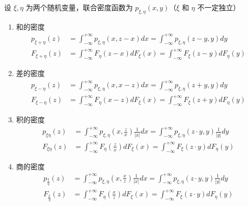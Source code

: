 \documentclass[12pt,a4paper]{amsart}
\begin{document}
\begin{proposition}
    设 $\xi, \eta$ 为两个随机变量，联合密度函数为 $p_{\xi, \eta}(x, y)$（$\xi$ 和 $\eta$ 不一定独立）
    \begin{enumerate}
        \item 和的密度
        \begin{equation}
            \begin{aligned}
                p_{\xi+\eta}(z) &= \int_{-\infty}^{+\infty}p_{\xi, \eta}(x, z-x)dx = \int_{-\infty}^{+\infty}p_{\xi, \eta}(z-y, y)dy \\
                F_{\xi+\eta}(z) &= \int_{-\infty}^{+\infty}F_{\eta}(z-x)dF_{\xi}(x) = \int_{-\infty}^{+\infty}F_{\xi}(z-y)dF_{\eta}(y)
            \end{aligned}
        \end{equation}
        \item 差的密度
        \begin{equation}
            \begin{aligned}
                p_{\xi-\eta}(z) &= \int_{-\infty}^{+\infty}p_{\xi, \eta}(x, x-z)dx = \int_{-\infty}^{+\infty}p_{\xi, \eta}(z+y, y)dy \\
                F_{\xi-\eta}(z) &= \int_{-\infty}^{+\infty}F_{\eta}(x-z)dF_{\xi}(x) = \int_{-\infty}^{+\infty}F_{\xi}(z+y)dF_{\eta}(y)
            \end{aligned}
        \end{equation}
        \item 积的密度
        \begin{equation}
            \begin{aligned}
                p_{\xi\eta}(z) &= \int_{-\infty}^{+\infty}p_{\xi, \eta}(x, \frac{z}{x})\frac{1}{|x|}dx = \int_{-\infty}^{+\infty}p_{\xi, \eta}(z\cdot y, y)\frac{1}{|y|}dy \\
                F_{\xi\eta}(z) &= \int_{-\infty}^{+\infty}F_{\eta}(\frac{z}{x})dF_{\xi}(x) = \int_{-\infty}^{+\infty}F_{\xi}(z\cdot y)dF_{\eta}(y)
            \end{aligned}
        \end{equation}
        \item 商的密度
        \begin{equation}
            \begin{aligned}
                p_{\frac{\xi}{\eta}}(z) &= \int_{-\infty}^{+\infty}p_{\xi, \eta}(x, \frac{x}{z})\frac{1}{|x|}dx = \int_{-\infty}^{+\infty}p_{\xi, \eta}(z\cdot y, y)\frac{1}{|y|}dy \\
                F_{\frac{\xi}{\eta}}(z) &= \int_{-\infty}^{+\infty}F_{\eta}(\frac{x}{z})dF_{\xi}(x) = \int_{-\infty}^{+\infty}F_{\xi}(z\cdot y)dF_{\eta}(y)
            \end{aligned}
        \end{equation}
    \end{enumerate}
\end{proposition}

\appendix



{\footnotesize}
\end{document}
